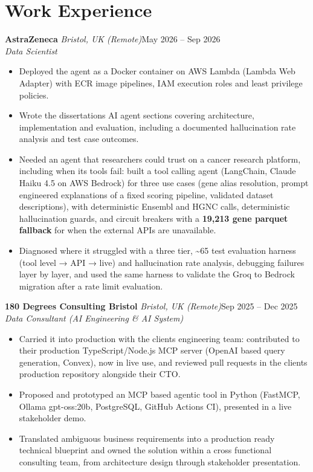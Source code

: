 \documentclass[a4paper,11pt]{article}
\newcommand{\role}[4]{%
  \textbf{#1}{\color{muted}\,\textperiodcentered\,\textit{#2}}\hfill{\color{muted}#3}\\
  \textit{#4}\par}
\newcommand{\gap}{\vspace{5pt}}
\newcommand{\num}[1]{\textbf{#1}}   %
\begin{document}
\section{Work Experience}
\role{AstraZeneca}{Bristol, UK (Remote)}{May 2026 – Sep 2026}{Data Scientist}
\begin{itemize}
  \item Deployed the agent as a Docker container on AWS Lambda (Lambda Web Adapter) with ECR image pipelines, IAM execution roles and least privilege policies.
  \item Wrote the dissertation\textquotesingle{}s AI agent sections covering architecture, implementation and evaluation, including a documented hallucination rate analysis and test case outcomes.
  \item Needed an agent that researchers could trust on a cancer research platform, including when its tools fail: built a tool calling agent (LangChain, Claude Haiku 4.5 on AWS Bedrock) for three use cases (gene alias resolution, prompt engineered explanations of a fixed scoring pipeline, validated dataset descriptions), with deterministic Ensembl and HGNC calls, deterministic hallucination guards, and circuit breakers with a \num{19,213 gene parquet fallback} for when the external APIs are unavailable.
  \item Diagnosed where it struggled with a three tier, \textasciitilde{}65 test evaluation harness (tool level → API → live) and hallucination rate analysis, debugging failures layer by layer, and used the same harness to validate the Groq to Bedrock migration after a rate limit evaluation.
\end{itemize}
\gap
{}
\role{180 Degrees Consulting Bristol}{Bristol, UK (Remote)}{Sep 2025 – Dec 2025}{Data Consultant (AI Engineering \& AI System)}
\begin{itemize}
  \item Carried it into production with the client\textquotesingle{}s engineering team: contributed to their production TypeScript/Node.js MCP server (OpenAI based query generation, Convex), now in live use, and reviewed pull requests in the client\textquotesingle{}s production repository alongside their CTO.
  \item Proposed and prototyped an MCP based agentic tool in Python (FastMCP, Ollama gpt-oss:20b, PostgreSQL, GitHub Actions CI), presented in a live stakeholder demo.
  \item Translated ambiguous business requirements into a production ready technical blueprint and owned the solution within a cross functional consulting team, from architecture design through stakeholder presentation.
\end{itemize}
\end{document}
